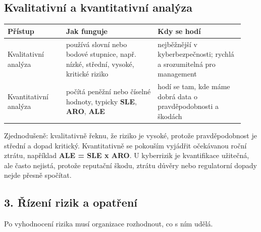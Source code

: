 
\subsection*{Kvalitativní a kvantitativní analýza}

\begin{longtable}{p{0.23\linewidth}p{0.36\linewidth}p{0.34\linewidth}}
\toprule
\textbf{Přístup} & \textbf{Jak funguje} & \textbf{Kdy se hodí} \\
\midrule\endhead
Kvalitativní analýza & používá slovní nebo bodové stupnice, např. nízké, střední, vysoké, kritické riziko & nejběžnější v kyberbezpečnosti; rychlá a srozumitelná pro management \\
\addlinespace
Kvantitativní analýza & počítá peněžní nebo číselné hodnoty, typicky \textbf{SLE}, \textbf{ARO}, \textbf{ALE} & hodí se tam, kde máme dobrá data o pravděpodobnosti a škodách \\
\bottomrule
\end{longtable}

Zjednodušeně: kvalitativně řeknu, že riziko je vysoké, protože pravděpodobnost je střední a dopad kritický. Kvantitativně se pokouším vyjádřit očekávanou roční ztrátu, například \textbf{ALE = SLE x ARO}. U kyberrizik je kvantifikace užitečná, ale často nejistá, protože reputační škodu, ztrátu důvěry nebo regulatorní dopady nejde přesně spočítat.

\subsection*{3. Řízení rizik a opatření}

Po vyhodnocení rizika musí organizace rozhodnout, co s ním udělá.

